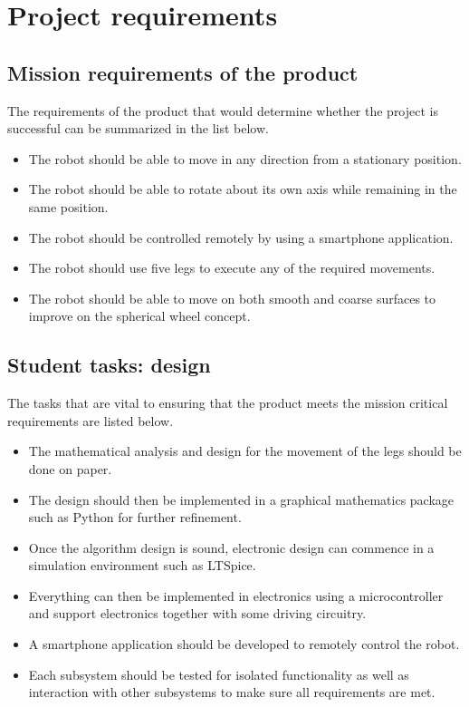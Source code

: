
\section{Project requirements}


\subsection{Mission requirements of the product}The requirements of the product that would determine whether the project is successful can be summarized in the list below.
\begin{itemize}
\item The robot should be able to move in any direction from a stationary position.
\item The robot should be able to rotate about its own axis while remaining in the same position.
\item The robot should be controlled remotely by using a smartphone application.
\item The robot should use five legs to execute any of the required movements.
\item The robot should be able to move on both smooth and coarse surfaces to improve on the spherical wheel concept.
\end{itemize}

\subsection{Student tasks: design}
The tasks that are vital to ensuring that the product meets the mission critical requirements are listed below.
\begin{itemize}
\item The mathematical analysis and design for the movement of the legs should be done on paper.
\item The design should then be implemented in a graphical mathematics package such as Python for further refinement.
\item Once the algorithm design is sound, electronic design can commence in a simulation environment such as LTSpice.
\item Everything can then be implemented in electronics using a microcontroller and support electronics together with some driving circuitry.
\item A smartphone application should be developed to remotely control the robot.
\item Each subsystem should be tested for isolated functionality as well as interaction with other subsystems to make sure all requirements are met. 
\end{itemize}

